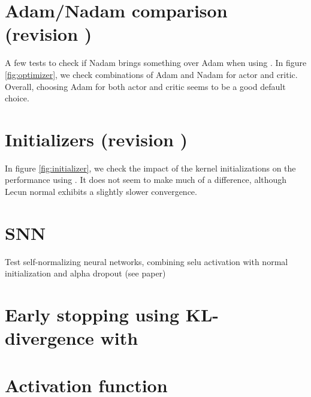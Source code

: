 \section{Adam/Nadam comparison (revision )}

A few tests to check if Nadam brings something over Adam when using \ppo. In figure \ref{fig:optimizer}, we check combinations of Adam and Nadam for actor and critic. Overall, choosing Adam for both actor and critic seems to be a good default choice.



\section{Initializers (revision )}

In figure \ref{fig:initializer}, we check the impact of the kernel initializations on the performance using \ppo. It does not seem to make much of a difference, although Lecun normal exhibits a slightly slower convergence.



\section{SNN}

Test self-normalizing neural networks, combining selu activation with normal initialization and alpha dropout (see paper)

\section{Early stopping using KL-divergence with \ppo}

\section{Activation function}

